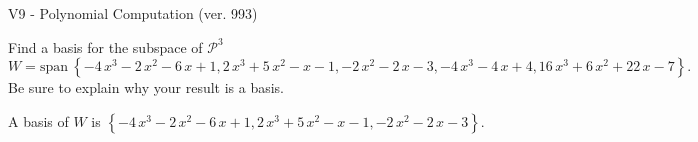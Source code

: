 \begin{exercise}
  \begin{exerciseTitle}V9 - Polynomial Computation (ver. 993)\end{exerciseTitle}
  \begin{exerciseStatement}
    Find a basis for the subspace of \(\mathcal{P}^3\) 
\[W=\mathrm{span}\ \left\{-4 \, x^{3} - 2 \, x^{2} - 6 \, x + 1 , 2 \, x^{3} + 5 \, x^{2} - x - 1 , -2 \, x^{2} - 2 \, x - 3 , -4 \, x^{3} - 4 \, x + 4 , 16 \, x^{3} + 6 \, x^{2} + 22 \, x - 7\right\}.\]
 Be sure to explain why your result is a basis.


  \end{exerciseStatement}
  \begin{exerciseAnswer}
   A basis of \(W\) is  \(\left\{-4 \, x^{3} - 2 \, x^{2} - 6 \, x + 1 , 2 \, x^{3} + 5 \, x^{2} - x - 1 , -2 \, x^{2} - 2 \, x - 3\right\}\).
  


  \end{exerciseAnswer}
\end{exercise}